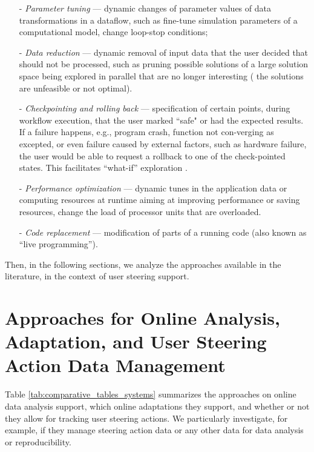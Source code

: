  \begin{itemize}
\setlength\itemsep{-2mm}

    \item[-] \textit{Parameter tuning} --- dynamic changes of parameter values of data transformations in a dataflow, such as fine-tune simulation parameters of a computational model,
    change loop-stop conditions;

    \item[-] \textit{Data reduction} --- dynamic removal of input data that the user decided that should not be processed, such as pruning possible solutions of a large solution space being explored in parallel that are no longer
interesting (\eg{} the solutions are unfeasible or not optimal).

    \item[-] \textit{Checkpointing and rolling back} --- specification of certain points, during workflow execution, that the user marked ``safe" or had the expected results. If a failure happens, e.g., program crash, function not con-verging as excepted, or even failure caused by external factors, such as hardware failure, the user would be able to request a rollback to one of the check-pointed states. This facilitates ``what-if'' exploration
    \cite{Bourhis2016Analyzing}.

    \item[-] \textit{Performance optimization} --- dynamic tunes in the application data or computing resources at runtime aiming at improving performance or saving resources, \eg{} change the load of
    processor units that are overloaded.

    \item[-] \textit{Code replacement}  --- modification of parts of a running code (also
known as ``live programming'').


 \end{itemize}

 Then, in the following sections, we analyze the approaches available in the literature, in the context of user steering support.




\section{Approaches for Online Analysis, Adaptation, and User Steering Action Data Management}

Table \ref{tab:comparative_tables_systems} summarizes the approaches on  online data analysis support, which online adaptations they support, and whether or not they allow for tracking user steering actions.
We particularly investigate, for example, if they manage steering action data or
any other data for data analysis or reproducibility.

